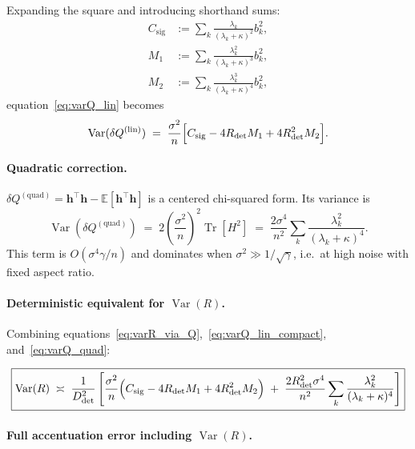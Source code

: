 Expanding the square and introducing shorthand sums:
\begin{align}
  C_{\mathrm{sig}} &:= \sum_{k}\frac{\lambda_{k}}{(\lambda_{k}+\kappa)^{2}}b_{k}^{2},
  \label{eq:Csig}\\
  M_{1} &:= \sum_{k}\frac{\lambda_{k}^{2}}{(\lambda_{k}+\kappa)^{3}}b_{k}^{2},
  \label{eq:M1}\\
  M_{2} &:= \sum_{k}\frac{\lambda_{k}^{3}}{(\lambda_{k}+\kappa)^{4}}b_{k}^{2},
  \label{eq:M2}
\end{align}
equation~\eqref{eq:varQ_lin} becomes
\begin{equation}
  \operatorname{Var}(\delta Q^{(\mathrm{lin})})
  \;=\;
  \frac{\sigma^{2}}{n}\Bigl[C_{\mathrm{sig}} - 4R_{\det}M_{1} + 4R_{\det}^{2}M_{2}\Bigr].
  \label{eq:varQ_lin_compact}
\end{equation}

\paragraph{Quadratic correction.}

$\delta Q^{(\mathrm{quad})} = \mathbf{h}^{\top}\mathbf{h}-\mathbb{E}[\mathbf{h}^{\top}\mathbf{h}]$ is
a centered chi-squared form.  Its variance is
\[
  \operatorname{Var}(\delta Q^{(\mathrm{quad})})
  \;=\;
  2\left(\frac{\sigma^{2}}{n}\right)^{\!2}\operatorname{Tr}[H^{2}]
  \;=\;
  \frac{2\sigma^{4}}{n^{2}}\sum_{k}\frac{\lambda_{k}^{2}}{(\lambda_{k}+\kappa)^{4}}.
  \label{eq:varQ_quad}
\]
This term is $O(\sigma^{4}\gamma/n)$ and dominates when $\sigma^{2}\gg 1/\sqrt{\gamma}$,
i.e.\ at high noise with fixed aspect ratio.

\paragraph{Deterministic equivalent for $\operatorname{Var}(R)$.}

Combining equations~\eqref{eq:varR_via_Q},~\eqref{eq:varQ_lin_compact},
and~\eqref{eq:varQ_quad}:

\begin{equation}
  \boxed{
  \operatorname{Var}(R)
  \;\asymp\;
  \frac{1}{D_{\det}^{2}}
  \left[
    \frac{\sigma^{2}}{n}\Bigl(C_{\mathrm{sig}} - 4R_{\det}M_{1} + 4R_{\det}^{2}M_{2}\Bigr)
    \;+\;
    \frac{2R_{\det}^{2}\sigma^{4}}{n^{2}}\sum_{k}\frac{\lambda_{k}^{2}}{(\lambda_{k}+\kappa)^{4}}
  \right]
  }
  \label{eq:varR_det}
\end{equation}

\paragraph{Full accentuation error including $\operatorname{Var}(R)$.}

